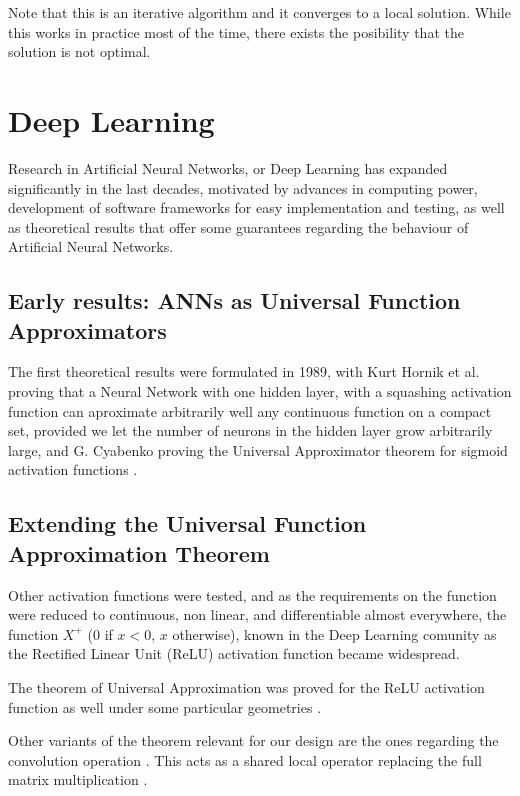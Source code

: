 Note that this is an iterative algorithm and it converges to a local solution. While this works in practice most of the time, there exists the posibility that the solution is not optimal.

\section{Deep Learning}
\label{sec:deep_learning}

Research in Artificial Neural Networks, or Deep Learning has expanded significantly in the last decades, motivated by advances in computing power, development of software frameworks for easy implementation and testing, as well as theoretical results that offer some guarantees regarding the behaviour of Artificial Neural Networks. 

\subsection*{Early results: ANNs as Universal Function Approximators}
The first theoretical results were formulated in 1989, with Kurt Hornik et al. \cite{Hornik1989} proving that a Neural Network with one hidden layer, with a squashing activation function can aproximate arbitrarily well any continuous function on a compact set, provided we let the number of neurons in the hidden layer grow arbitrarily large, and G. Cyabenko proving the Universal Approximator theorem for sigmoid activation functions \cite{Cybenko1989}.

\subsection*{Extending the Universal Function Approximation Theorem}
Other activation functions were tested, and as the requirements on the function were reduced to continuous, non linear, and differentiable almost everywhere, the function $X^+$ (0 if $x < 0$, $x$ otherwise), known in the Deep Learning comunity as the Rectified Linear Unit (ReLU) activation function became widespread.

The theorem of Universal Approximation was proved for the ReLU activation function as well under some particular geometries \cite{Hanin2019, Lu2017}. 

Other variants of the theorem relevant for our design are the ones regarding the convolution operation \cite{Zhou2020, Yarotsky2018}. This acts as a shared local operator replacing the full matrix multiplication .

